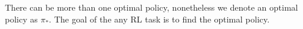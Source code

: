 There can be more than one optimal policy, nonetheless we denote an optimal policy as
$\pi_{*}$. The goal of the any RL task is to find the optimal policy.






%
%
%
%
%
%
%
%
%

